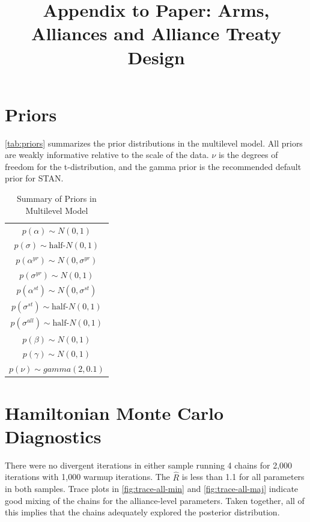\documentclass[12pt]{article}
\title{\textbf{Appendix to Paper: Arms, Alliances and Alliance Treaty Design}}
\date{}
\begin{document}
\maketitle 

\doublespace 



\section{Priors}

\autoref{tab:priors} summarizes the prior distributions in the multilevel model. 
All priors are weakly informative relative to the scale of the data. 
$\nu$ is the degrees of freedom for the t-distribution, and the gamma prior is the recommended default prior for STAN. 

\begin{table} %
\begin{center}
\begin{tabular}{c} 
$ p(\alpha) \sim N(0, 1)$  \\
$ p(\sigma) \sim \mbox{half-}N(0, 1) $ \\
$ p(\alpha^{yr}) \sim N(0, \sigma^{yr}) $ \\ 
$ p(\sigma^{yr}) \sim N(0, 1) $ \\
$ p(\alpha^{st}) \sim N(0, \sigma^{st}) $ \\ 
$ p(\sigma^{st}) \sim \mbox{half-}N(0, 1) $ \\ 
$ p(\sigma^{all}) \sim \mbox{half-}N(0, 1) $ \\
$ p(\beta) \sim N(0, 1) $ \\
$ p(\gamma) \sim N(0, 1) $ \\ 
$ p(\nu) \sim gamma(2, 0.1)$ 
\end{tabular} 
\caption{Summary of Priors in Multilevel Model} 
\label{tab:priors}
\end{center} 
\end{table} 


\section{Hamiltonian Monte Carlo Diagnostics}

There were no divergent iterations in either sample running 4 chains for 2,000 iterations with 1,000 warmup iterations. 
The $\hat{R}$ is less than 1.1 for all parameters in both samples. 
Trace plots in \autoref{fig:trace-all-min} and \autoref{fig:trace-all-maj} indicate good mixing of the chains for the alliance-level parameters. 
Taken together, all of this implies that the chains adequately explored the posterior distribution. 
\end{document}
